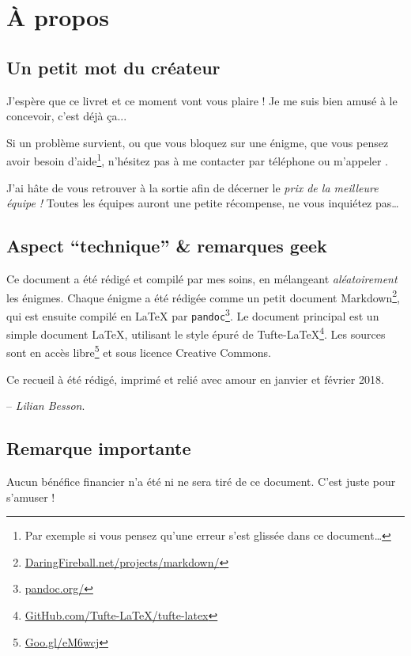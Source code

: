 \chapter{À propos}

\section*{Un petit mot du créateur}

J'espère que ce livret et ce moment vont vous plaire !
Je me suis bien amusé à le concevoir, c'est déjà ça...

Si un problème survient, ou que vous bloquez sur une énigme, que vous pensez avoir besoin d'aide\footnote{Par exemple si vous pensez qu'une erreur s'est glissée dans ce document…}, n'hésitez pas à me contacter par téléphone ou m'appeler
.

J'ai hâte de vous retrouver à la sortie afin de décerner le \emph{prix de la meilleure équipe !}
Toutes les équipes auront une petite récompense, ne vous inquiétez pas…


\section*{Aspect ``technique'' \& remarques geek}
Ce document a été rédigé et compilé par mes soins, en mélangeant \emph{aléatoirement} les \nbenigmes{} énigmes.
%
Chaque énigme a été rédigée comme un petit document Markdown\footnote{\url{DaringFireball.net/projects/markdown/}},
qui est ensuite compilé en \LaTeX{} par \texttt{pandoc}\footnote{\url{pandoc.org/}}.
%
Le document principal est un simple document \LaTeX,
utilisant le style épuré de Tufte-\LaTeX{}\footnote{\url{GitHub.com/Tufte-LaTeX/tufte-latex}}.
%
Les sources sont en accès libre\footnote{\url{Goo.gl/eM6wcj}} et sous licence Creative Commons.

Ce recueil à été rédigé, imprimé et relié avec amour en janvier et février 2018.


\hfill{} -- \emph{Lilian Besson}.

\section*{Remarque importante}
Aucun bénéfice financier n'a été ni ne sera tiré de ce document.
C'est juste pour s'amuser !
